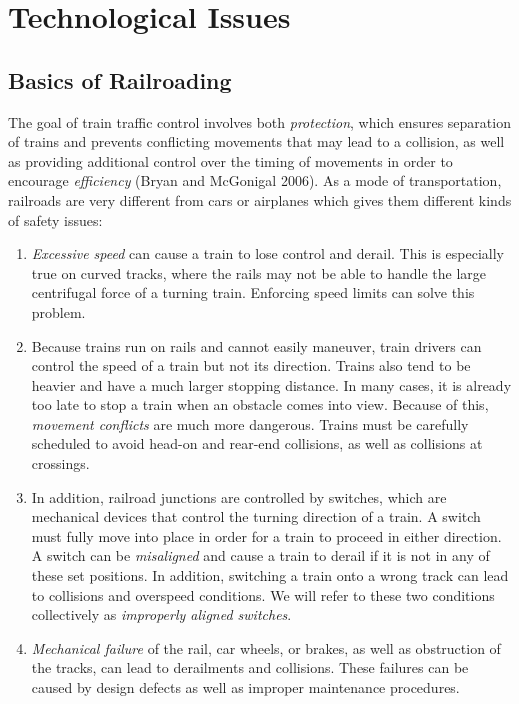 \documentclass[11pt, titlepage]{article}
\begin{document}
\pagebreak

\section{Technological Issues}

\subsection{Basics of Railroading}

The goal of train traffic control involves both \textit{protection}, which ensures
separation of trains and prevents conflicting movements that may lead to a
collision, as well as providing additional control over the timing of movements in
order to encourage \textit{efficiency} (Bryan and McGonigal 2006). As a mode of
transportation, railroads are very different from cars or airplanes which gives
them different kinds of safety issues:

\begin{enumerate}
    \item \textit{Excessive speed} can cause a train to lose control and derail.
    This is especially true on curved tracks, where the rails may not be able to
    handle the large centrifugal force of a turning train. Enforcing speed limits
    can solve this problem.
    \item Because trains run on rails and cannot easily maneuver, train drivers
    can control the speed of a train but not its direction. Trains also tend to be
    heavier and have a much larger stopping distance. In many cases, it is already
    too late to stop a train when an obstacle comes into view. Because of this,
    \textit{movement conflicts} are much more dangerous. Trains must be carefully
    scheduled to avoid head-on and rear-end collisions, as well as collisions at
    crossings.
    \item In addition, railroad junctions are controlled by switches, which are
    mechanical devices that control the turning direction of a train. A switch
    must fully move into place in order for a train to proceed in either
    direction. A switch can be \textit{misaligned} and cause a train to derail if
    it is not in any of these set positions. In addition, switching a train onto a
    wrong track can lead to collisions and overspeed conditions. We will refer to
    these two conditions collectively as \textit{improperly aligned switches}.
    \item \textit{Mechanical failure} of the rail, car wheels, or brakes, as well
    as obstruction of the tracks, can lead to derailments and collisions. These
    failures can be caused by design defects as well as improper maintenance
    procedures.
\end{enumerate}
\end{document}
